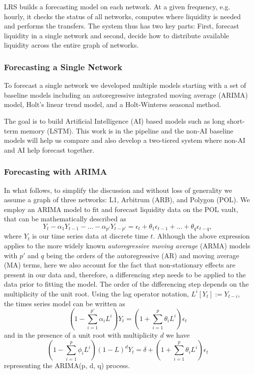 LRS builds a forecasting model on each network. At a given frequency, e.g. hourly, it checks the status of all networks, computes where liquidity is needed and performs the transfers.
%
The system thus has two key parts: First, forecast liquidity in a single network and second, decide how to distribute available liquidity across the entire graph of networks.

\subsubsection*{Forecasting a Single Network}

To forecast a single network we developed multiple models starting with a set of baseline models including an autoregressive integrated moving average (ARIMA) model, Holt's linear trend model, and a Holt-Winterss seasonal method.

The goal is to build Artificial Intelligence (AI) based models such as long short-term memory (LSTM). This work is in the pipeline and the non-AI baseline models will help us compare and also develop a two-tiered system where non-AI and AI help forecast together.

\subsubsection*{Forecasting with ARIMA}

In what follows, to simplify the discussion and without loss of generality we assume a graph of three networks: L1, Arbitrum (ARB), and Polygon (POL).
%
We employ an ARIMA model to fit and forecast liquidity data on the POL vault, that can be mathematically described as 
%
\begin{equation}
    Y_t - \alpha_1Y_{t-1} - \dots - \alpha_{p'}Y_{t-p'} = \epsilon_t + \theta_1\epsilon_{t-1} + \dots + \theta_q\epsilon_{t-q},
\end{equation}
%
where $Y_t$ is our time series data at discrete time $t$. Although the above expression applies to the more widely known \emph{autoregressive moving average} (ARMA) models with $p'$ and $q$ being the orders of the autoregressive (AR) and moving average (MA) terms, here we also account for the fact that non-stationary effects are present in our data and, therefore, a differencing step needs to be applied to the data prior to fitting the model. The order of the differencing step depends on the multiplicity of the unit root. Using the lag operator notation, $L^i[Y_t] := Y_{t-i}$, the times series model can be written as 
%
\begin{equation}
    \left(1 - \sum_{i=1}^{p'} \alpha_i L^i\right) Y_t = \left(1 + \sum_{i=1}^p\theta_i L^i\right)\epsilon_t
\end{equation}
%
and in the presence of a unit root with multiplicity $d$ we have 
%
\begin{equation}
    \left(1 - \sum_{i=1}^{p} \phi_i L^i\right) (1 - L)^d Y_t = \delta + \left(1 + \sum_{i=1}^p\theta_i L^i\right)\epsilon_t
\end{equation}
%
representing the ARIMA(p, d, q) process.

